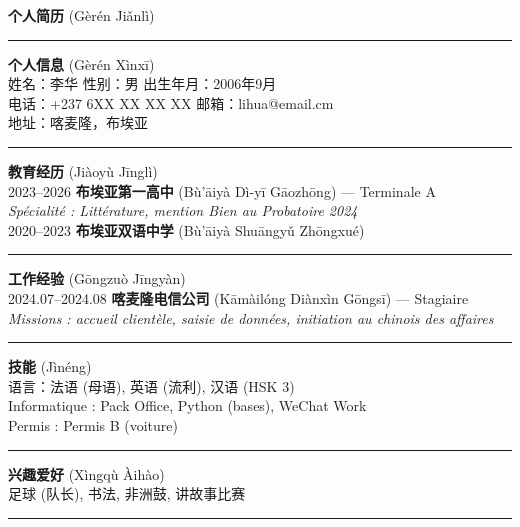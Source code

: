 \documentclass[11pt]{article}
\begin{document}
\begin{textebox}
\textbf{个人简历} (Gèrén Jiǎnlì) \\ 
\noindent\rule{\linewidth}{0.4pt}\par
\textbf{个人信息} (Gèrén Xìnxī) \\
姓名：李华 \quad 性别：男 \quad 出生年月：2006年9月 \\
电话：+237 6XX XX XX XX \quad 邮箱：lihua@email.cm \\
地址：喀麦隆，布埃亚 \\ 
\noindent\rule{\linewidth}{0.4pt}\par
\textbf{教育经历} (Jiàoyù Jīnglì) \\
2023--2026 \quad \textbf{布埃亚第一高中} (Bù'āiyà Dì-yī Gāozhōng) — Terminale A \\
\quad \textit{Spécialité : Littérature, mention Bien au Probatoire 2024} \\
2020--2023 \quad \textbf{布埃亚双语中学} (Bù'āiyà Shuāngyǔ Zhōngxué) \\
\noindent\rule{\linewidth}{0.4pt}\par
\textbf{工作经验} (Gōngzuò Jīngyàn) \\
2024.07--2024.08 \quad \textbf{喀麦隆电信公司} (Kāmàilóng Diànxìn Gōngsī) — Stagiaire \\
\quad \textit{Missions : accueil clientèle, saisie de données, initiation au chinois des affaires} \\
\noindent\rule{\linewidth}{0.4pt}\par
\textbf{技能} (Jìnéng) \\
语言：法语 (母语), 英语 (流利), 汉语 (HSK 3) \\
Informatique : Pack Office, Python (bases), WeChat Work \\
Permis : Permis B (voiture) \\
\noindent\rule{\linewidth}{0.4pt}\par
\textbf{兴趣爱好} (Xìngqù Àihào) \\
足球 (队长), 书法, 非洲鼓, 讲故事比赛 \\
\noindent\rule{\linewidth}{0.4pt}\par
\end{textebox}
\end{document}
